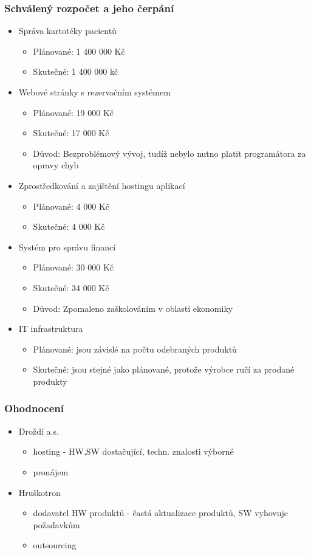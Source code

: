 \documentclass[11pt, a4paper, titlepage]{article}
\begin{document}
	\subsubsection*{Schválený rozpočet a jeho čerpání}
	\begin{itemize}
		\item Správa kartotéky pacientů
		\begin{itemize}
			\item Plánované: 1 400 000 Kč
			\item Skutečné: 1 400 000 kč
		\end{itemize}
		\item Webové stránky s rezervačním systémem
		\begin{itemize}
			\item Plánované: 19 000 Kč
			\item Skutečné: 17 000 Kč
			\item Důvod: Bezproblémový vývoj, tudíž nebylo nutno platit programátora za opravy chyb
		\end{itemize}
		\item Zprostředkování a zajištění hostingu aplikací
		\begin{itemize}
			\item Plánované: 4 000 Kč
			\item Skutečné: 4 000 Kč
		\end{itemize}
		\item Systém pro správu financí
		\begin{itemize}
			\item Plánované: 30 000 Kč
			\item Skutečné: 34 000 Kč
			\item Důvod: Zpomaleno zaškolováním v oblasti ekonomiky
		\end{itemize}
		\item IT infrastruktura
		\begin{itemize}
			\item Plánované: jsou závislé na počtu odebraných produktů
			\item Skutečné: jsou stejné jako plánované, protože výrobce ručí za prodané produkty
		\end{itemize}
	\end{itemize}

	\subsubsection*{Ohodnocení}
	\begin{itemize}
		\item Droždí a.s.
		\begin{itemize}
			\item hosting - HW,SW dostačující, techn. znalosti výborné
			\item pronájem
		\end{itemize}
		\item Hruškotron
		\begin{itemize}
			\item dodavatel HW produktů - častá aktualizace produktů, SW vyhovuje požadavkům
			\item outsourcing
		\end{itemize}
	\end{itemize}
	
\end{document}
